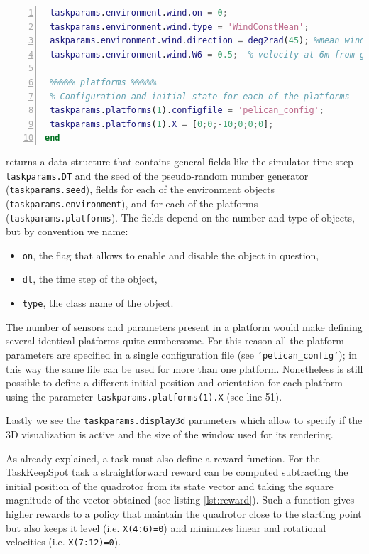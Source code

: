 \documentclass[a4paper,11pt]{report}
\begin{document}
\begin{lstlisting}[float=ht!bp,caption=TaskKeepSpot init() method,language=Matlab,frame=lines,label=lst:init,numbers=left,basicstyle=\small]
 % Wind - a steady omogeneous wind common to all helicopters
 taskparams.environment.wind.on = 0;
 taskparams.environment.wind.type = 'WindConstMean';
 askparams.environment.wind.direction = deg2rad(45); %mean wind direction
 taskparams.environment.wind.W6 = 0.5;  % velocity at 6m from ground in m/s
            
 %%%%% platforms %%%%%
 % Configuration and initial state for each of the platforms
 taskparams.platforms(1).configfile = 'pelican_config';
 taskparams.platforms(1).X = [0;0;-10;0;0;0];       
end
\end{lstlisting}
returns a data structure that contains general fields like the simulator time step \texttt{taskparams.DT} and the seed of the pseudo-random number generator (\texttt{taskparams.seed}), fields for each of the environment objects (\texttt{taskparams.environment}), and for each of the platforms (\texttt{taskparams.platforms}). The fields depend on the number and type of objects, but by convention we name:
\begin{itemize}
\item \texttt{on}, the flag that allows to enable and disable the object in question,
\item \texttt{dt}, the time step of the object,
\item \texttt{type}, the class name of the object.
\end{itemize}

The number of sensors and parameters present in a platform would make defining several identical platforms quite cumbersome. For this reason all the platform parameters are specified in a single configuration file (see \texttt{'pelican\_config'}); in this way the same file can be used for more than one platform. Nonetheless is still possible to define a different initial position and orientation for each platform using the parameter \texttt{taskparams.platforms(1).X} (see line 51).

Lastly we see the \texttt{taskparams.display3d} parameters which allow to specify if the 3D visualization is active and the size of the window used for its rendering. 

As already explained, a task must also define a reward function. For the TaskKeepSpot task a straightforward reward can be computed subtracting the initial position of the quadrotor from its state vector and taking the square magnitude of the vector obtained (see listing \ref{lst:reward}). 
Such a function gives higher rewards to a policy that maintain the quadrotor close to the starting point but also keeps it level (i.e. \texttt{X(4:6)=0}) and minimizes linear and rotational velocities (i.e. \texttt{X(7:12)=0}).
\end{document}
